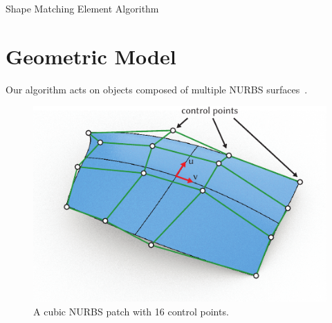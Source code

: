 \begin{algorithm}[h]
\begin{algorithmic}[1]
  			\EndFor
     	\EndWhile
	\EndProcedure
\end{algorithmic}
\caption{Shape Matching Element Algorithm}
\end{algorithm}

\section{Geometric Model}

Our algorithm acts on objects composed of multiple NURBS surfaces~.

\begin{figure}
    \includegraphics[width=\columnwidth]{figures/nurbs_patch}
    \caption{A cubic NURBS patch with 16 control points.}
    \label{fig:NURBS}
\end{figure}

